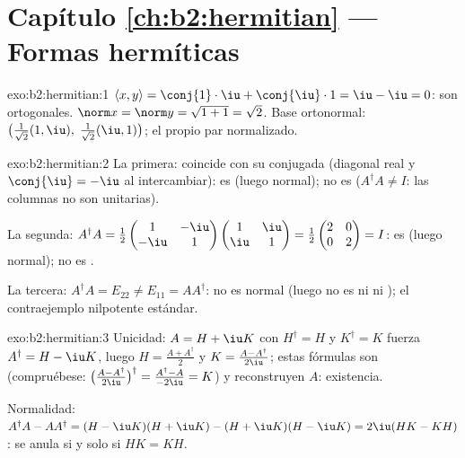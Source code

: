 \section*{Capítulo \ref{ch:b2:hermitian} --- Formas hermíticas}

\begin{solution}{exo:b2:hermitian:1}
$\langle x, y\rangle = \conj{1}\cdot\iu + \conj{\iu}\cdot 1 = \iu -
\iu = 0$: son ortogonales. $\norm x = \norm y = \sqrt{1 + 1} =
\sqrt2$. Base ortonormal: $\bigl(\frac{1}{\sqrt2}(1, \iu),\;
\frac{1}{\sqrt2}(\iu, 1)\bigr)$; el propio par normalizado.
\end{solution}

\begin{solution}{exo:b2:hermitian:2}
La primera: coincide con su  conjugada (diagonal real y
$\conj{\iu} = -\iu$ al intercambiar): es  (luego normal); no
es  ($A^\dagger A \neq I$: las columnas no son unitarias).

La segunda: $A^\dagger A = \frac12\begin{pmatrix} 1 & -\iu\\ -\iu &
1\end{pmatrix}\begin{pmatrix} 1 & \iu\\ \iu & 1\end{pmatrix} =
\frac12\begin{pmatrix} 2 & 0\\ 0 & 2\end{pmatrix} = I$: es 
(luego normal); no es .

La tercera: $A^\dagger A = E_{22} \neq E_{11} = AA^\dagger$: no es
normal (luego no es ni  ni ); el contraejemplo
nilpotente estándar.
\end{solution}

\begin{solution}{exo:b2:hermitian:3}
Unicidad: $A = H + \iu K$ con $H^\dagger = H$ y $K^\dagger = K$
fuerza $A^\dagger = H - \iu K$, luego $H = \frac{A + A^\dagger}{2}$ y
$K = \frac{A - A^\dagger}{2\iu}$; estas fórmulas son 
(compruébese: $\bigl(\frac{A - A^\dagger}{2\iu}\bigr)^\dagger =
\frac{A^\dagger - A}{-2\iu} = K$) y reconstruyen $A$: existencia.

Normalidad: $A^\dagger A - AA^\dagger = (H - \iu K)(H + \iu K) - (H +
\iu K)(H - \iu K) = 2\iu(HK - KH)$: se anula si y solo si $HK = KH$.
\end{solution}

